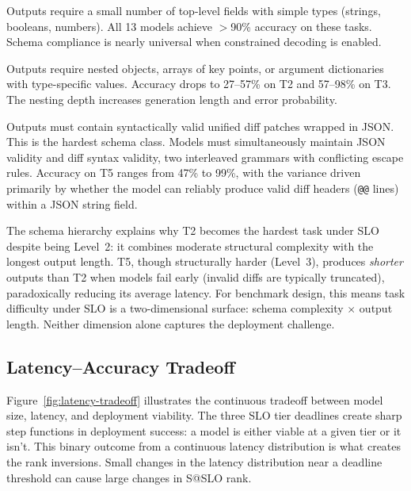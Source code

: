 \documentclass[11pt]{article}
\begin{document}
\begin{description}[leftmargin=*]
\item[Level 1: Flat schemas (T1, T4).] Outputs require a small number of top-level fields with simple types (strings, booleans, numbers).  All 13 models achieve $>$90\% accuracy on these tasks.  Schema compliance is nearly universal when constrained decoding is enabled.

\item[Level 2: Nested schemas (T2, T3).] Outputs require nested objects, arrays of key points, or argument dictionaries with type-specific values.  Accuracy drops to 27--57\% on T2 and 57--98\% on T3.  The nesting depth increases generation length and error probability.

\item[Level 3: Embedded code (T5).] Outputs must contain syntactically valid unified diff patches wrapped in JSON.  This is the hardest schema class.  Models must simultaneously maintain JSON validity and diff syntax validity, two interleaved grammars with conflicting escape rules.  Accuracy on T5 ranges from 47\% to 99\%, with the variance driven primarily by whether the model can reliably produce valid diff headers (\texttt{@@} lines) within a JSON string field.
\end{description}

The schema hierarchy explains why T2 becomes the hardest task under SLO despite being Level~2: it combines moderate structural complexity with the longest output length.  T5, though structurally harder (Level~3), produces \emph{shorter} outputs than T2 when models fail early (invalid diffs are typically truncated), paradoxically reducing its average latency.  For benchmark design, this means task difficulty under SLO is a two-dimensional surface: schema complexity $\times$ output length.  Neither dimension alone captures the deployment challenge.

\subsection{Latency--Accuracy Tradeoff}

Figure~\ref{fig:latency-tradeoff} illustrates the continuous tradeoff between model size, latency, and deployment viability.  The three SLO tier deadlines create sharp step functions in deployment success: a model is either viable at a given tier or it isn't.  This binary outcome from a continuous latency distribution is what creates the rank inversions.  Small changes in the latency distribution near a deadline threshold can cause large changes in S@SLO rank.
\end{document}
